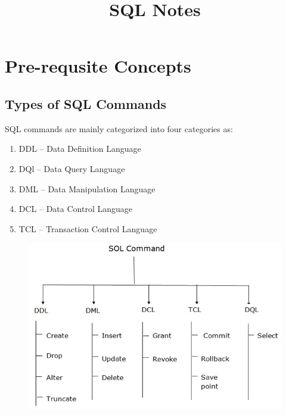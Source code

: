 \documentclass{article}
\title{\vspace{-3cm} SQL Notes}
\author{}
\date{}
\begin{document}
\maketitle
\vspace{-1.5cm}
\tableofcontents
\newpage

\section{Pre-requsite Concepts}

\subsection{Types of SQL Commands}
    SQL commands are mainly categorized into four categories as:
    \begin{enumerate}
        \item DDL -- Data Definition Language
        \item DQl -- Data Query Language
        \item DML -- Data Manipulation Language
        \item DCL -- Data Control Language
        \item TCL -- Transaction Control Language
    \end{enumerate}
    
    \begin{figure}[h]
        \centering
        \includegraphics[width=14cm]{dbms-sql-command.png}
    \end{figure}
\end{document}
